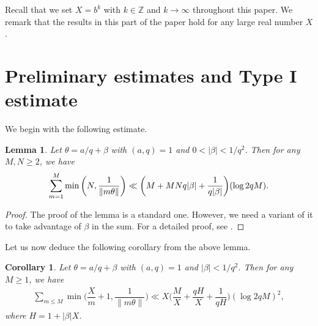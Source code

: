 \documentclass[12pt]{amsart}
\numberwithin{equation}{section}
\newtheorem{lemma}[theorem]{Lemma}
\newtheorem{cor}[theorem]{Corollary}
\theoremstyle{remark}
\theoremstyle{definition}
\begin{document}
Recall that we set $X=b^k$ with $k\in \mathbb{Z}$ and $k\rightarrow \infty$ throughout this paper. We remark that the results in this part of the paper hold for any large real number $X$.  




\section{Preliminary estimates and Type I estimate}\label{sec: type I}
We begin with the following estimate.



\begin{lemma}\label{lemma1}
Let $\theta = a/q + \beta$ with $(a, q)=1$ and $0< |\beta| < 1/q^2$. Then for any $M, N \geq 2$, we have
\begin{equation}
\notag \sum_{m=1}^M\min \bigg(N, \dfrac{1}{\lVert m\theta \rVert}\bigg) \ll \bigg(M + MNq\lvert \beta\rvert + \dfrac{1}{q\lvert \beta \rvert}\bigg)(\log 2qM).
\end{equation} 
\end{lemma}
\begin{proof}
The proof of the lemma is a standard one. However, we need a variant of it to take advantage of $\beta$ in the sum. For a detailed proof, see \cite[Lemma 4.1]{May2}.
\end{proof}

Let us now deduce the following corollary from the above lemma.
\begin{cor}\label{Corollary1}
Let $\theta = a/q + \beta$ with $(a, q)=1$ and $|\beta| < 1/q^2$. Then for any $M\geq 1$, we have
\begin{align}
\label{cor1eq}\sum_{m\leq M}\min\bigg(\dfrac{X}{m}+1,\dfrac{1}{\|m\theta\|}\bigg) \ll X\bigg(\dfrac{M}{X} + \dfrac{qH}{X}+ \dfrac{1}{qH}\bigg)(\log 2qM)^2,
\end{align}
where $H=1+|\beta|X$.
\end{cor}
\end{document}
